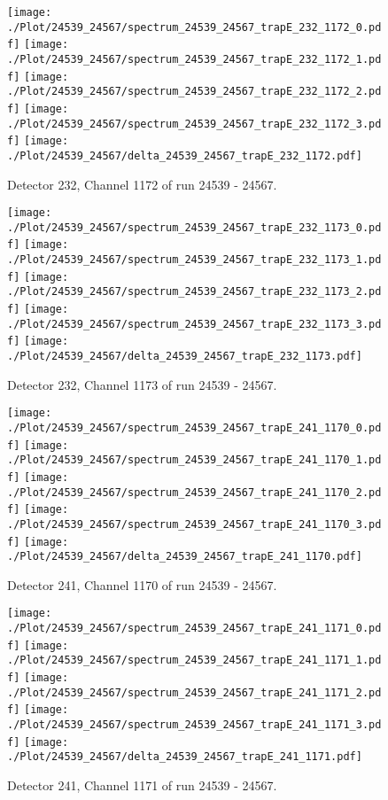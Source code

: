 \clearpage
\begin{figure}[hb]
\centering
\texttt{[image: ./Plot/24539\_24567/spectrum\_24539\_24567\_trapE\_232\_1172\_0.pdf]}
\texttt{[image: ./Plot/24539\_24567/spectrum\_24539\_24567\_trapE\_232\_1172\_1.pdf]}
\texttt{[image: ./Plot/24539\_24567/spectrum\_24539\_24567\_trapE\_232\_1172\_2.pdf]}
\texttt{[image: ./Plot/24539\_24567/spectrum\_24539\_24567\_trapE\_232\_1172\_3.pdf]}
\texttt{[image: ./Plot/24539\_24567/delta\_24539\_24567\_trapE\_232\_1172.pdf]}
\caption{ Detector 232, Channel 1172 of run 24539 - 24567.}
\label{fig:24539_24567_trapE_232_1172}
\end{figure}
\clearpage
\begin{figure}[hb]
\centering
\texttt{[image: ./Plot/24539\_24567/spectrum\_24539\_24567\_trapE\_232\_1173\_0.pdf]}
\texttt{[image: ./Plot/24539\_24567/spectrum\_24539\_24567\_trapE\_232\_1173\_1.pdf]}
\texttt{[image: ./Plot/24539\_24567/spectrum\_24539\_24567\_trapE\_232\_1173\_2.pdf]}
\texttt{[image: ./Plot/24539\_24567/spectrum\_24539\_24567\_trapE\_232\_1173\_3.pdf]}
\texttt{[image: ./Plot/24539\_24567/delta\_24539\_24567\_trapE\_232\_1173.pdf]}
\caption{ Detector 232, Channel 1173 of run 24539 - 24567.}
\label{fig:24539_24567_trapE_232_1173}
\end{figure}
\clearpage
\begin{figure}[hb]
\centering
\texttt{[image: ./Plot/24539\_24567/spectrum\_24539\_24567\_trapE\_241\_1170\_0.pdf]}
\texttt{[image: ./Plot/24539\_24567/spectrum\_24539\_24567\_trapE\_241\_1170\_1.pdf]}
\texttt{[image: ./Plot/24539\_24567/spectrum\_24539\_24567\_trapE\_241\_1170\_2.pdf]}
\texttt{[image: ./Plot/24539\_24567/spectrum\_24539\_24567\_trapE\_241\_1170\_3.pdf]}
\texttt{[image: ./Plot/24539\_24567/delta\_24539\_24567\_trapE\_241\_1170.pdf]}
\caption{ Detector 241, Channel 1170 of run 24539 - 24567.}
\label{fig:24539_24567_trapE_241_1170}
\end{figure}
\clearpage
\begin{figure}[hb]
\centering
\texttt{[image: ./Plot/24539\_24567/spectrum\_24539\_24567\_trapE\_241\_1171\_0.pdf]}
\texttt{[image: ./Plot/24539\_24567/spectrum\_24539\_24567\_trapE\_241\_1171\_1.pdf]}
\texttt{[image: ./Plot/24539\_24567/spectrum\_24539\_24567\_trapE\_241\_1171\_2.pdf]}
\texttt{[image: ./Plot/24539\_24567/spectrum\_24539\_24567\_trapE\_241\_1171\_3.pdf]}
\texttt{[image: ./Plot/24539\_24567/delta\_24539\_24567\_trapE\_241\_1171.pdf]}
\caption{ Detector 241, Channel 1171 of run 24539 - 24567.}
\label{fig:24539_24567_trapE_241_1171}
\end{figure}
